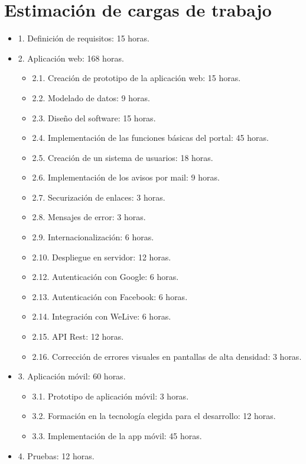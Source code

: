 \documentclass{DeustoFDP}
\begin{document}
\section{Estimación de cargas de trabajo}
\begin{itemize}
    \item 1. Definición de requisitos: 15 horas.
    \item 2. Aplicación web: 168 horas.
    \begin{itemize}
        \item 2.1. Creación de prototipo de la aplicación web: 15 horas.
        \item 2.2. Modelado de datos: 9 horas.
        \item 2.3. Diseño del software: 15 horas.
        \item 2.4. Implementación de las funciones básicas del portal: 45 horas.
        \item 2.5. Creación de un sistema de usuarios: 18 horas.
        \item 2.6. Implementación de los avisos por mail: 9 horas.
        \item 2.7. Securización de enlaces: 3 horas.
        \item 2.8. Mensajes de error: 3 horas.
        \item 2.9. Internacionalización: 6 horas.
        \item 2.10. Despliegue en servidor: 12 horas.
        \item 2.12. Autenticación con Google: 6 horas.
        \item 2.13. Autenticación con Facebook: 6 horas.
        \item 2.14. Integración con WeLive: 6 horas.
        \item 2.15. API Rest: 12 horas.
        \item 2.16. Corrección de errores visuales en pantallas de alta densidad: 3 horas.
    \end{itemize}
    \item 3. Aplicación móvil: 60 horas.
    \begin{itemize}
        \item 3.1. Prototipo de aplicación móvil: 3 horas.
        \item 3.2. Formación en la tecnología elegida para el desarrollo: 12 horas.
        \item 3.3. Implementación de la app móvil: 45 horas.
    \end{itemize}
    \item 4. Pruebas: 12 horas.
\end{itemize}
\end{document}
